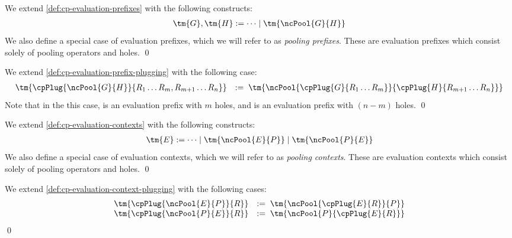 \documentclass[UKenglish]{llncs}
\begin{document}
\begin{definition}\label{def:nc-evaluation-prefixes}
  We extend \cref{def:cp-evaluation-prefixes} with the following constructs:
  \begin{align*}
    \tm{G}, \tm{H} := \dots \mid \tm{\ncPool{G}{H}}
  \end{align*}
  We also define a special case of evaluation prefixes, which we will refer to
  as \emph{pooling prefixes}. These are evaluation prefixes which consist solely
  of pooling operators and holes. 
  \qed
\end{definition}

\begin{definition}[Plugging]\label{def:nc-evaluation-prefix-plugging}
  We extend \cref{def:cp-evaluation-prefix-plugging} with the following case:
  \[
    \begin{array}{ll}
      \tm{\cpPlug{\ncPool{G}{H}}{R_1 \dots R_m, R_{m+1} \dots R_{n}}}
      & := \; \tm{\ncPool{\cpPlug{G}{R_1 \dots R_m}}{\cpPlug{H}{R_{m+1} \dots R_n}}}
    \end{array}
  \]
  Note that in the this case,  is an evaluation prefix with $m$ holes,
  and  is an evaluation prefix with $(n-m)$ holes.
  \qed
\end{definition}

\begin{definition}\label{def:nc-evaluation-contexts}
  We extend \cref{def:cp-evaluation-contexts} with the following constructs:
  \begin{align*}
    \tm{E} := \dots \mid \tm{\ncPool{E}{P}} \mid \tm{\ncPool{P}{E}}
  \end{align*}
  We also define a special case of evaluation contexts, which we will refer to
  as \emph{pooling contexts}. These are evaluation contexts which consist solely
  of pooling operators and holes.
  \qed
\end{definition}

\begin{definition}[Plugging]\label{def:nc-evaluation-context-plugging}
  We extend \cref{def:cp-evaluation-context-plugging} with the following cases:
  \begin{gather*}
    \begin{array}{ll}
      \tm{\cpPlug{\ncPool{E}{P}}{R}}
      & := \; \tm{\ncPool{\cpPlug{E}{R}}{P}}
      \\
      \tm{\cpPlug{\ncPool{P}{E}}{R}}
      & := \; \tm{\ncPool{P}{\cpPlug{E}{R}}}
    \end{array}
  \end{gather*}
  \qed
\end{definition}
\end{document}
